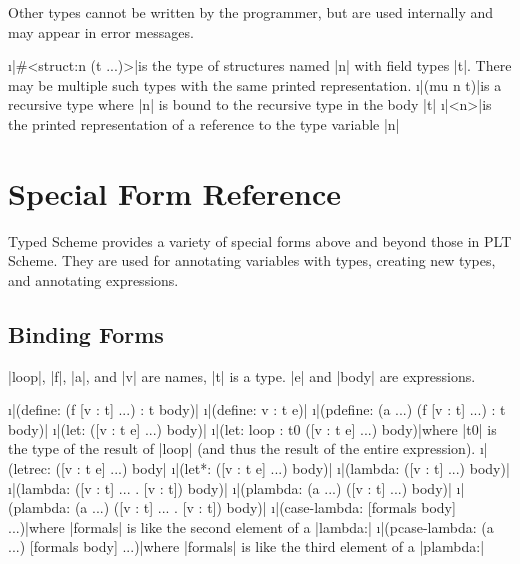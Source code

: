 \documentclass{book}
\begin{document}
\begin{schemeregion}
Other types cannot be written by the programmer, but are used
internally and may appear in error messages.


\begin{itemize}
        \i{\scheme|#<struct:n (t ...)>|}{is the type of structures named
\scheme|n| with field types \scheme|t|.  There may be multiple such
types with the same printed representation.}
        \i{\scheme|(mu n t)|}{is a recursive type where \scheme|n| is bound to the
recursive type in the body \scheme|t|}
        \i{\scheme|<n>|}{is the printed representation of a reference to the
type variable \scheme|n|}
\end{itemize}


\chapter{Special Form Reference}

Typed Scheme provides a variety of special forms above and beyond
those in PLT Scheme.  They are used for annotating variables with types,
creating new types, and annotating expressions.

\section{Binding Forms}

\scheme|loop|, \scheme|f|, \scheme|a|, and \scheme|v| are names, \scheme|t| is a type.
 \scheme|e| and \scheme|body| are expressions.

\begin{itemize}
  \i{\scheme|(define: (f [v : t] ...) : t body)|}{}
  \i{\scheme|(define: v : t e)|}{}
  \i{\scheme|(pdefine: (a ...) (f [v : t] ...) : t body)|}{}
  \i{\scheme|(let: ([v : t e] ...) body)|}{}
  \i{\scheme|(let: loop : t0 ([v : t e] ...) body)|}{where \scheme|t0| is the type of the
  result of \scheme|loop| (and thus the result of the entire expression).}
  \i{\scheme|(letrec: ([v : t e] ...) body|}{}
  \i{\scheme|(let*: ([v : t e] ...) body)|}{}
  \i{\scheme|(lambda: ([v : t] ...) body)|}{}
  \i{\scheme|(lambda: ([v : t] ... . [v : t]) body)|}{}
  \i{\scheme|(plambda: (a ...) ([v : t] ...) body)|}{}
  \i{\scheme|(plambda: (a ...) ([v : t] ... . [v : t]) body)|}{}
  \i{\scheme|(case-lambda: [formals body] ...)|}{where \scheme|formals| is like
  the second element of a \scheme|lambda:|}
  \i{\scheme|(pcase-lambda: (a ...) [formals body] ...)|}{where \scheme|formals| is like
  the third element of a \scheme|plambda:|}
\end{itemize}


\end{schemeregion}
\end{document}
